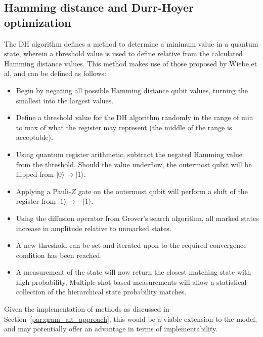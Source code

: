 \begin{appendices}
\section{Hamming distance and Durr-Hoyer optimization}\label{app:hamming_dh}
The DH algorithm defines a method to determine a minimum value in a quantum state, wherein a threshold value is used to define relative from the calculated Hamming distance values. This method makes use of those proposed by Wiebe et al, and can be defined as follows:

\begin{itemize}
\item Begin by negating all possible Hamming distance qubit values, turning the smallest into the largest values.
\item Define a threshold value for the DH algorithm randomly in the range of min to max of what the register may represent (the middle of the range is acceptable).
\item Using quantum register arithmetic, subtract the negated Hamming value from the threshold. Should the value underflow, the outermost qubit will be flipped from $\vert0\rangle\rightarrow \vert 1\rangle$.
\item Applying a Pauli-$Z$ gate on the outermost qubit will perform a shift of the register from $\vert1\rangle\rightarrow -\vert1\rangle$.
\item Using the diffusion operator from Grover's search algorithm, all marked states increase in amplitude relative to unmarked states.
\item A new threshold can be set and iterated upon to the required convergence condition has been reached.
\item A measurement of the state will now return the closest matching state with high probability, Multiple shot-based measurements will allow a statistical collection of the hierarchical state probability matches.
\end{itemize}
Given the implementation of methods as discussed in Section~\ref{par:qram_alt_approach}, this would be a viable extension to the model, and may potentially offer an advantage in terms of implementability.


\end{appendices}
